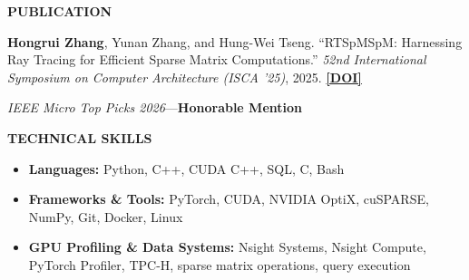 \documentclass[11pt]{article}
\newcommand{\resheading}[1]{%
  \par\addvspace{12pt}%
  \noindent\colorbox{sectiongray}{%
    \parbox{\dimexpr\linewidth-2\fboxsep\relax}{\strut\small\textbf{#1}}%
  }\par\nobreak\vspace{5pt}\nopagebreak[4]%
}
\begin{document}
\resheading{PUBLICATION}
\textbf{Hongrui Zhang}, Yunan Zhang, and Hung-Wei Tseng.
``RTSpMSpM: Harnessing Ray Tracing for Efficient Sparse Matrix Computations.''
\textit{52nd International Symposium on Computer Architecture (ISCA '25)}, 2025.
\href{https://doi.org/10.1145/3695053.3731072}{\textbf{[DOI]}}
\par\nobreak\vspace{3pt}
\textit{IEEE Micro Top Picks 2026}\enspace---\enspace\textbf{Honorable Mention}\par

\resheading{TECHNICAL SKILLS}
\begin{itemize}[label={},leftmargin=0pt,itemsep=5pt]
  \item \textbf{Languages:} Python, C++, CUDA C++, SQL, C, Bash
  \item \textbf{Frameworks \& Tools:} PyTorch, CUDA, NVIDIA OptiX, cuSPARSE, NumPy, Git, Docker, Linux
  \item \textbf{GPU Profiling \& Data Systems:} Nsight Systems, Nsight Compute, PyTorch Profiler, TPC-H, sparse matrix operations, query execution
\end{itemize}
\end{document}

